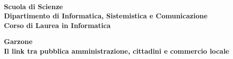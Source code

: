 \begin{titlepage}
	\noindent
	\begin{minipage}[t]{0.18\textwidth}
	\end{minipage}
	\begin{minipage}[t]{0.82\textwidth}
		{
			 \\
			\textbf{Scuola di Scienze} \\
			\textbf{Dipartimento di Informatica, Sistemistica e Comunicazione} \\
			\textbf{Corso di Laurea in Informatica} \\
			\par
		}
	\end{minipage}
	
	\vspace{40mm}
	
	\begin{center}
		{\LARGE{
				\textbf{Garzone \\ Il link tra pubblica amministrazione, cittadini e commercio locale}
				\par
		}}
	\end{center}
	

\end{titlepage}
